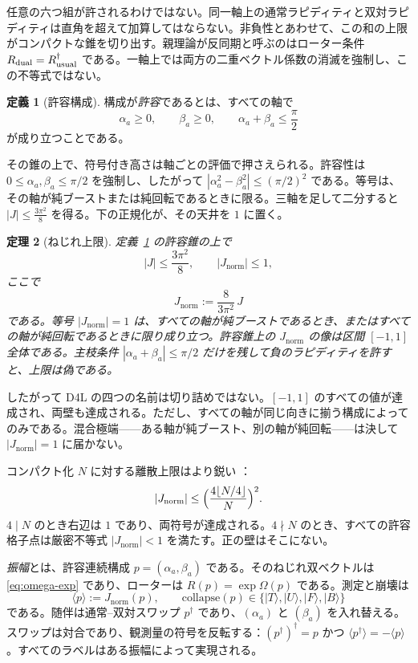 \documentclass[a4paper]{article}
\newtheorem{theorem}{定理}[section]
\theoremstyle{definition}
\newtheorem{definition}[theorem]{定義}
\newcommand{\Jnorm}{J_{\mathrm{norm}}}
\newcommand{\Jbound}{\frac{3\pi^2}{8}}
\begin{document}
任意の六つ組が許されるわけではない。同一軸上の通常ラピディティと双対ラピディティは直角を超えて加算してはならない。非負性とあわせて、この和の上限がコンパクトな錐を切り出す。親理論が反同期と呼ぶのはローター条件 \(R_{\rm dual}=R_{\rm usual}^\dagger\) である。一軸上では両方の二重ベクトル係数の消滅を強制し、この不等式ではない。

\begin{definition}[許容構成]
\label{def:admissible}
構成が\emph{許容}であるとは、すべての軸で
\[
\alpha_a\ge 0,\qquad \beta_a\ge 0,\qquad \alpha_a+\beta_a\le \frac{\pi}{2}
\]
が成り立つことである。
\end{definition}

その錐の上で、符号付き高さは軸ごとの評価で押さえられる。許容性は \(0\le\alpha_a,\beta_a\le\pi/2\) を強制し、したがって \(|\alpha_a^2-\beta_a^2|\le(\pi/2)^2\) である。等号は、その軸が純ブーストまたは純回転であるときに限る。三軸を足して二分すると \(|J|\le\Jbound\) を得る。下の正規化が、その天井を \(1\) に置く。

\begin{theorem}[ねじれ上限]
\label{thm:torsion-bound}
定義~\ref{def:admissible} の許容錐の上で
\[
|J|\le\Jbound,\qquad |\Jnorm|\le 1,
\]
ここで
\begin{equation}
\label{eq:Jnorm}
\Jnorm := \frac{8}{3\pi^2}\,J
\end{equation}
である。等号 \(|\Jnorm|=1\) は、すべての軸が純ブーストであるとき、またはすべての軸が純回転であるときに限り成り立つ。許容錐上の \(\Jnorm\) の像は区間 \([-1,1]\) 全体である。主枝条件 \(|\alpha_a+\beta_a|\le\pi/2\) だけを残して負のラピディティを許すと、上限は偽である。
\end{theorem}

したがって D4L の四つの名前は切り詰めではない。\([-1,1]\) のすべての値が達成され、両壁も達成される。ただし、すべての軸が同じ向きに揃う構成によってのみである。混合極端——ある軸が純ブースト、別の軸が純回転——は決して \(|\Jnorm|=1\) に届かない。

コンパクト化 \(N\) に対する離散上限はより鋭い \cite{Diophantine2026}：
\[
|\Jnorm|\le\Bigl(\frac{4\lfloor N/4\rfloor}{N}\Bigr)^2.
\]
\(4\mid N\) のとき右辺は \(1\) であり、両符号が達成される。\(4\nmid N\) のとき、すべての許容格子点は厳密不等式 \(|\Jnorm|<1\) を満たす。正の壁はそこにない。

\emph{振幅}とは、許容連続構成 \(p=(\alpha_a,\beta_a)\) である。そのねじれ双ベクトルは \eqref{eq:omega-exp} であり、ローターは \(R(p)=\exp\Omega(p)\) である。測定と崩壊は
\[
\langle p\rangle:=\Jnorm(p),\qquad
\mathrm{collapse}(p)
\in\{\lvert T\rangle,\lvert U\rangle,\lvert F\rangle,\lvert B\rangle\}
\]
である。随伴は通常–双対スワップ \(p^\dagger\) であり、\((\alpha_a)\) と \((\beta_a)\) を入れ替える。スワップは対合であり、観測量の符号を反転する：\((p^\dagger)^\dagger=p\) かつ \(\langle p^\dagger\rangle=-\langle p\rangle\)。すべてのラベルはある振幅によって実現される。
\end{document}
